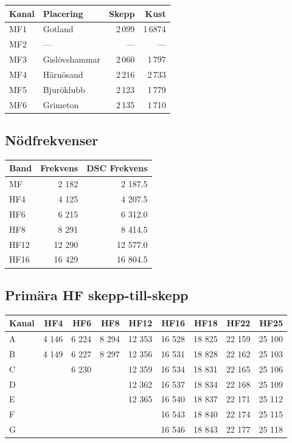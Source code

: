 \begin{longtable}{llrr}
\textbf{Kanal} & \textbf{Placering} & \textbf{Skepp} & \textbf{Kust}  \\ \hline
\endhead

MF1 & Gotland       & 2\,099 & 1\,6874 \\
MF2 & ---           & ---  & ---   \\
MF3 & Gislövshammar & 2\,060 & 1\,797  \\
MF4 & Härnösand     & 2\,216 & 2\,733  \\
MF5 & Bjuröklubb    & 2\,123 & 1\,779  \\
MF6 & Grimeton      & 2\,135 & 1\,710
\end{longtable}

\subsection{Nödfrekvenser}

\begin{longtable}{lrr}
\textbf{Band} & \textbf{Frekvens} & \textbf{DSC Frekvens}\\ \hline \endhead

MF   & 2 182  & 2 187.5  \\
HF4  & 4 125  & 4 207.5  \\
HF6  & 6 215  & 6 312.0  \\
HF8  & 8 291  & 8 414.5  \\
HF12 & 12 290 & 12 577.0 \\
HF16 & 16 429 & 16 804.5 \\
\end{longtable}

\subsection{Primära HF skepp-till-skepp}

\begin{longtable}{lrrrrrrrr}
\textbf{Kanal} & \textbf{HF4} & \textbf{HF6} & \textbf{HF8} &
               \textbf{HF12} & \textbf{HF16} & \textbf{HF18} &
               \textbf{HF22} & \textbf{HF25} \\
\hline
\endhead

A & 4 146 & 6 224 & 8 294 & 12 353 & 16 528 & 18 825 & 22 159 & 25 100 \\
B & 4 149 & 6 227 & 8 297 & 12 356 & 16 531 & 18 828 & 22 162 & 25 103 \\
C &       & 6 230 &       & 12 359 & 16 534 & 18 831 & 22 165 & 25 106 \\
D &       &       &       & 12 362 & 16 537 & 18 834 & 22 168 & 25 109 \\
E &       &       &       & 12 365 & 16 540 & 18 837 & 22 171 & 25 112 \\
F &       &       &       &        & 16 543 & 18 840 & 22 174 & 25 115 \\
G &       &       &       &        & 16 546 & 18 843 & 22 177 & 25 118 \\
\end{longtable}

